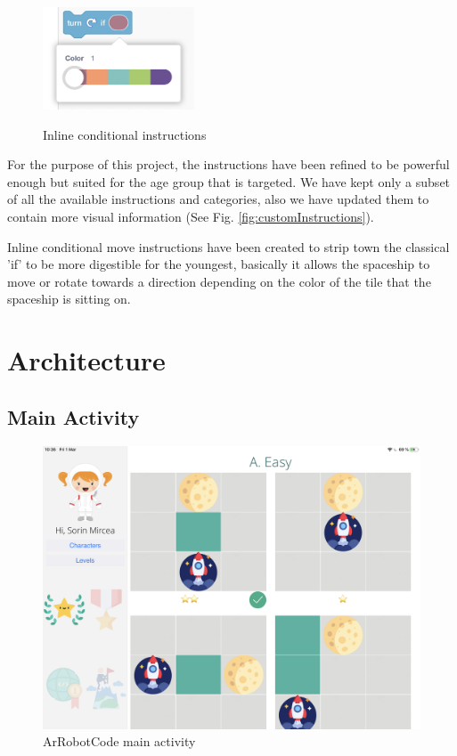 \documentclass[12 pct]{report}
\begin{document}
\begin{figure}[H]
\includegraphics[width=0.4\textwidth]{newIf}
\centering
\label{fig:hololens}
\caption{Inline conditional instructions}
\end{figure}


For the purpose of this project, the instructions have been refined to be powerful enough but suited for the age group that is targeted.
We have kept only a subset of all the available instructions and categories, also we have updated them to contain more visual information (See Fig. \ref{fig:customInstructions}).


Inline conditional move instructions have been created to strip town the classical 'if'  to be more digestible for the youngest, basically it allows the spaceship to move or rotate towards a direction depending on the color of the tile that the spaceship is sitting on.
\section{Architecture}

\subsection*{Main Activity}
\begin{figure}[H]
\includegraphics[width=1.0\textwidth]{ArRobotCode0}
\centering
\caption{ArRobotCode main activity}
\label{fig:mainActivity}
\end{figure}
\end{document}

